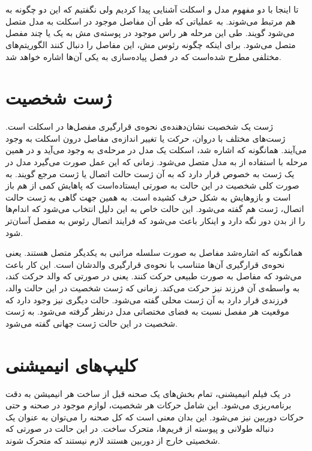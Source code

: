 \section{
}

تا اینجا با دو مفهوم مدل و اسکلت آشنایی پیدا کردیم ولی نگفتیم که این دو چگونه به هم مرتبط می‌شوند.
به عملیاتی که طی آن مفاصل موجود در اسکلت به مدل متصل می‌شود 
گویند.
طی این مرحله هر راس موجود در پوسته‌ی مش به یک یا چند مفصل متصل می‌شود.
برای اینکه چگونه رئوس مش، این مفاصل را دنبال کنند الگوریتم‌های مختلفی مطرح شده‌است که در فصل پیاده‌سازی به یکی آن‌ها اشاره ‌خواهد شد.


\section{ژست شخصیت}

ژست یک شخصیت نشان‌دهنده‌ی نحوه‌ی قرارگیری مفصل‌ها در اسکلت است. ژست‌های مختلف با دروان، حرکت یا تغییر اندازه‌ی مفاصل درون اسکلت به وجود می‌‌آیند.
همانگونه که اشاره شد، اسکلت یک مدل در مرحله‌ی 
به وجود می‌‌آید و در همین مرحله با استفاده از 
 به مدل متصل می‌شود. زمانی که این عمل صورت می‌گیرد مدل در یک ژست به خصوص قرار دارد که به آن ژست حالت اتصال
یا
ژست مرجع
گویند.
به صورت کلی شخصیت در این حالت به صورتی ایستاده‌است که پاهایش کمی از هم باز است و 
بازو‌هایش به شکل حرف
کشیده است. به همین جهت گاهی به ژست حالت اتصال،
ژست
هم گفته می‌شود.
این حالت خاص به این دلیل انتخاب می‌شود که اندام‌ها را از بدن دور نگه دارد و اینکار باعث می‌شود که 
فرایند اتصال رئوس به مفصل آسان‌تر شود.

همانگونه که اشاره‌‌شد مفاصل به صورت سلسله مراتبی به یکدیگر متصل هستند. یعنی نحوه‌ی 
قرارگیری آن‌ها متناسب با نحوه‌ی قرارگیری والدشان است.
این کار باعث می‌شود که مفاصل به صورت طبیعی حرکت کنند. یعنی در صورتی که والد حرکت کند، به واسطه‌ی 
آن فرزند نیز حرکت می‌کند.
زمانی که ژست شخصیت در این حالت والد، فرزندی قرار دارد به آن ژست محلی
گفته می‌شود. حالت دیگری نیز وجود دارد که موقعیت هر مفصل نسبت به فضای مختصاتی مدل 
درنظر گرفته می‌شود. به ژست شخصیت در این حالت ژست جهانی
گفته می‌شود.

\section{‌کلیپ‌های انیمیشنی}

در یک فیلم انیمیشنی، تمام بخش‌های یک صحنه قبل از ساخت هر انیمیشن به دقت برنامه‌ریزی می‌شود.
این شامل حرکات هر شخصیت، لوازم موجود در صحنه و حتی حرکات دوربین نیز می‌شود.
این بدان معنی است که کل صحنه را می‌توان به عنوان یک دنباله طولانی و پیوسته از فریم‌ها، متحرک ساخت.
در این حالت در صورتی که شخصیتی خارج از دوربین هستند لازم نیستند که متحرک شوند.

